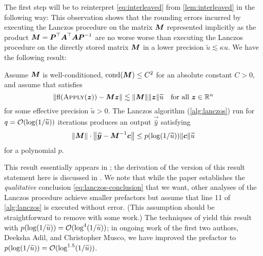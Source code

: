 \documentclass[onefignum,onetabnum,pagebackref,dvipsnames]{siamart220329}
\begin{document}
The first step will be to reinterpret \cref{eq:interleaved} from \cref{lem:interleaved} in the following way:
%
%
\noindent This observation shows that the rounding errors incurred by executing the Lanczos procedure on the matrix $\boldsymbol{M}$ represented implicitly as the product $\boldsymbol{M} = \boldsymbol{P}^{\-\top}\boldsymbol{A}^\top\boldsymbol{A}\boldsymbol{P}^{-1}$ are no worse worse than executing the Lanczos procedure on the directly stored matrix $\boldsymbol{M}$ in a lower precision $\tilde{u} \lesssim \kappa u$.
We have the following result:

\begin{fact} \label{fact:lanczos}
    Assume $\boldsymbol{M}$ is well-conditioned, $\operatorname{cond}(\boldsymbol{M}) \le C^2$ for an absolute constant $C > 0$, and assume that  satisfies
    \begin{equation} \label{eq:lanczos-hypothesis}
        \norm{\fl(\Call{Apply}{\vec{z}}) - \mat{M}\vec{z}} \lesssim \norm{\mat{M}}\norm{\vec{z}} \tilde{u} \quad \text{for all }\vec{z} \in \real^n
    \end{equation}
    for some effective precision $\tilde{u} > 0$.
    The Lanczos algorithm (\cref{alg:lanczos}) run for $q = \mathcal{O}(\log(1/\widetilde{u}))$ iterations produces an output $\vec{\hat{y}}$ satisfying
    \begin{equation} \label{eq:lanczos-conclusion}
        \norm{\mat{M}} \cdot \norm{\vec{\hat{y}} - \mat{M}^{-1}\vec{c}} \le p(\log(1/\tilde{u})) \norm{\vec{c}}\tilde{u}
    \end{equation}
    for a polynomial $p$.
\end{fact}
%
This result essentially appears in \cite[sec.~6]{MMS18}; the derivation of the version of this result statement here is discussed in \cite[app.~C]{EMN24}.
We note that while the paper \cite{MMS18} establishes the \emph{qualitative} conclusion \cref{eq:lanczos-conclusion} that we want, other analyses \cite{DK92,DGK98} of the Lanczos procedure achieve smaller prefactors but assume that line 11 of \cref{alg:lanczos} is executed without error.
(This assumption should be straightforward to remove with some work.)
The techniques of \cite{MMS18} yield this result with $p(\log(1/\widetilde{u})) = \mathcal{O}(\log^4(1/\widetilde{u}))$; in ongoing work of the first two authors, Deeksha Adil, and Christopher Musco, we have improved the prefactor to $p(\log(1/\widetilde{u})) = \mathcal{O}(\log^{1.5}(1/\widetilde{u}))$.
\end{document}
